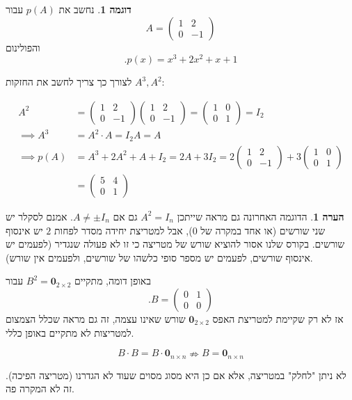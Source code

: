 \documentclass[12pt]{report}
\theoremstyle{plain}
\theoremstyle{definition}
\newtheorem{example}{דוגמה}[chapter]
\newtheorem{remark}{הערה}[chapter]
\newcommand{\0}{\mathbf{0}}
\begin{document}
\begin{example}
נחשב את
$p(A)$
עבור
$$
A=\begin{pmatrix}
1 &2 \\
0 &-1
\end{pmatrix}
$$
והפולינום
$$
.p(x)=x^3+2x^2+x+1
$$

לצורך כך צריך לחשב את החזקות
$A^3, A^2$:

$$
\begin{aligned}
A^2&=\begin{pmatrix}
1 &2 \\
0 &-1
\end{pmatrix}\begin{pmatrix}
1 &2 \\
0 &-1
\end{pmatrix}=\begin{pmatrix}
1 &0 \\
0 &1
\end{pmatrix}=I_2\\
\implies A^3&=A^2\cdot A=I_2 A=A \\
\implies p(A)&=A^3+2A^2+A+I_2=2A+3I_2=2\begin{pmatrix}
1 &2 \\
0 &-1
\end{pmatrix}+3\begin{pmatrix}
1 &0 \\
0 &1
\end{pmatrix} \\
&=\begin{pmatrix}
5 &4 \\
0 &1
\end{pmatrix}
\end{aligned}
$$

\end{example}

\begin{remark}
הדוגמה האחרונה גם מראה שייתכן
$A^2=I_n$
גם אם
$A\neq\pm I_n$.
אמנם לסקלר יש שני שורשים (או אחד במקרה של
$0$),
אבל למטריצת יחידה מסדר לפחות 
$2$
יש אינסוף שורשים. בקורס שלנו אסור להוציא שורש של מטריצה כי זו לא פעולה שנגדיר (לפעמים יש אינסוף שורשים, לפעמים יש מספר סופי כלשהו של שורשים, ולפעמים אין שורש).

באופן דומה, מתקיים
$B^2=\0_{2\times 2}$
עבור
$$
.B=\begin{pmatrix}
0 &1 \\
0 &0
\end{pmatrix}
$$
אז לא רק שקיימת למטריצת האפס
$\0_{2\times 2}$
שורש שאינו עצמה, זה גם מראה שכלל הצמצום למטריצות לא מתקיים באופן כללי.

$$
B\cdot B=B\cdot \0_{n\times n} \nRightarrow B=\0_{n\times n}
$$

לא ניתן "לחלק" במטריצה, אלא אם כן היא מסוג מסוים שעוד לא הגדרנו (מטריצה הפיכה). זה לא המקרה פה.

\end{remark}
\end{document}
